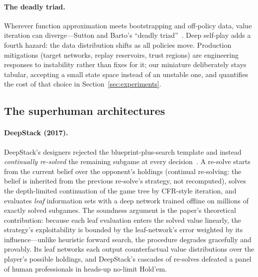 \paragraph{The deadly triad.} Wherever function approximation meets bootstrapping and off-policy data, value iteration can diverge---Sutton and Barto's ``deadly triad''~\cite{sutton2018rl}. Deep self-play adds a fourth hazard: the data distribution shifts as all policies move. Production mitigations (target networks, replay reservoirs, trust regions) are engineering responses to instability rather than fixes for it; our miniature deliberately stays tabular, accepting a small state space instead of an unstable one, and quantifies the cost of that choice in Section~\ref{sec:experiments}.

\subsection{The superhuman architectures}

\paragraph{DeepStack (2017).} DeepStack's designers rejected the blueprint-plus-search template and instead \emph{continually re-solved} the remaining subgame at every decision~\cite{moravcik2017deepstack}. A re-solve starts from the current belief over the opponent's holdings (continual re-solving: the belief is inherited from the previous re-solve's strategy, not recomputed), solves the depth-limited continuation of the game tree by CFR-style iteration, and evaluates \emph{leaf} information sets with a deep network trained offline on millions of exactly solved subgames. The soundness argument is the paper's theoretical contribution: because each leaf evaluation enters the solved value linearly, the strategy's exploitability is bounded by the leaf-network's error weighted by its influence---unlike heuristic forward search, the procedure degrades gracefully and provably. Its leaf networks each output counterfactual value distributions over the player's possible holdings, and DeepStack's cascades of re-solves defeated a panel of human professionals in heads-up no-limit Hold'em.

